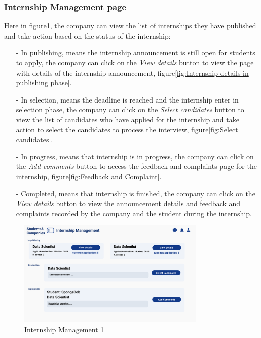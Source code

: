 \subsubsection{Internship Management page}
Here in figure\ref{fig:Internship Management 1}, the company can view the list of internships they have published and take action based on the status of the internship:
\begin{itemize}
    \item[-] In publishing, means the internship announcement is still open for students to apply, the company can click on the \textit{View details} button to view the page with details of the internship announcement, figure\ref{fig:Internship details in publishing phase}.
    \item[-] In selection, means the deadline is reached and the internship enter in selection phase, the company can click on the 
    \textit{Select candidates} button to view the list of candidates who have applied for the internship and take action to select 
    the candidates to process the interview, figure\ref{fig:Select candidates}.
    \item[-] In progress, means that internship is in progress, the company can click on the \textit{Add comments} button to access the feedback and complaints page for the internship, figure\ref{fig:Feedback and Complaint}.
    \item[-] Completed, means that internship is finished, the company can click on the \textit{View details} button to view the announcement details and feedback and complaints recorded by the company and the student during the internship.
\end{itemize}

\begin{figure}[H]
    \centering
    \includegraphics[width=0.8\textwidth]{Images/UI/Internship Management-company.png}
    \caption{Internship Management 1}\label{fig:Internship Management 1}
\end{figure}

